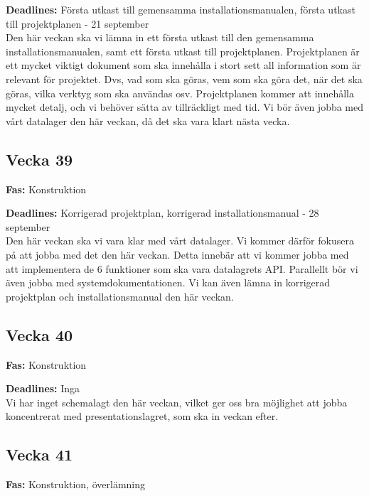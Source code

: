 \documentclass{TDP003mall}
\begin{document}
\textbf{Deadlines:} Första utkast till gemensamma installationsmanualen, första utkast till projektplanen - 21 september\\

Den här veckan ska vi lämna in ett första utkast till den gemensamma installationsmanualen, samt ett första utkast till projektplanen.
Projektplanen är ett mycket viktigt dokument som ska innehålla i stort sett all information som är relevant för projektet. Dvs, vad som ska göras, vem som ska göra det, när det ska göras, vilka verktyg som ska användas osv. Projektplanen kommer att innehålla mycket detalj, och vi behöver sätta av tillräckligt med tid. 
Vi bör även jobba med vårt datalager den här veckan, då det ska vara klart nästa vecka.\\


\subsection*{Vecka 39}

\textbf{Fas:} Konstruktion

\textbf{Deadlines:} Korrigerad projektplan, korrigerad installationsmanual - 28 september\\

Den här veckan ska vi vara klar med vårt datalager. Vi kommer därför fokusera på att jobba med det den här veckan. Detta innebär att vi kommer jobba med att implementera de 6 funktioner som ska vara datalagrets API. Parallellt bör vi även jobba med systemdokumentationen.
Vi kan även lämna in korrigerad projektplan och installationsmanual den här veckan.\\


\subsection*{Vecka 40}

\textbf{Fas:} Konstruktion

\textbf{Deadlines:} Inga\\

Vi har inget schemalagt den här veckan, vilket ger oss bra möjlighet att jobba koncentrerat med presentationslagret, som ska in veckan efter.\\


\subsection*{Vecka 41}

\textbf{Fas:} Konstruktion, överlämning
\end{document}
